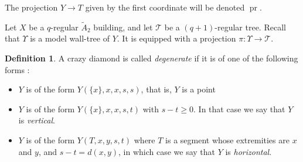 \documentclass[a4paper, 11pt]{article}
\theoremstyle{plain}
\newtheorem{lemma}[proposition]{Lemma}
\theoremstyle{definition}
\newtheorem{definition}[proposition]{Definition}
\theoremstyle{remark}
\DeclareMathOperator{\pr}{pr}
\DeclareMathOperator{\lk}{lk}
\begin{document}
The projection $Y\to T$ given by the first coordinate will be denoted $\pr$.

Let $X$ be a $q$-regular $\tilde A_2$ building, and let $\mathcal T$ be a $(q+1)$-regular tree. Recall that $\Upsilon$ is a model wall-tree of $Y$. It is equipped with a projection $\pi:\Upsilon\to \mathcal T$.

\begin{definition}
 A crazy diamond is called \emph{degenerate} if it is of one of the following forms :
 \begin{itemize}
     \item $Y$ is of the form $Y(\{x\},x,x,s,s)$, that is, $Y$ is a point
     \item $Y$ is of the form $Y(\{x\},x,x,s,t)$ with $s-t\geq 0$. In that case we say that $Y$ is \emph{vertical}. 
     \item $Y$ is of the form $Y(T,x,y,s,t)$ where $T$ is a segment whose extremities are $x$ and $y$, and $s-t=d(x,y)$, in which case we say that $Y$ is \emph{horizontal}.
 \end{itemize}
\end{definition}

\end{document}

